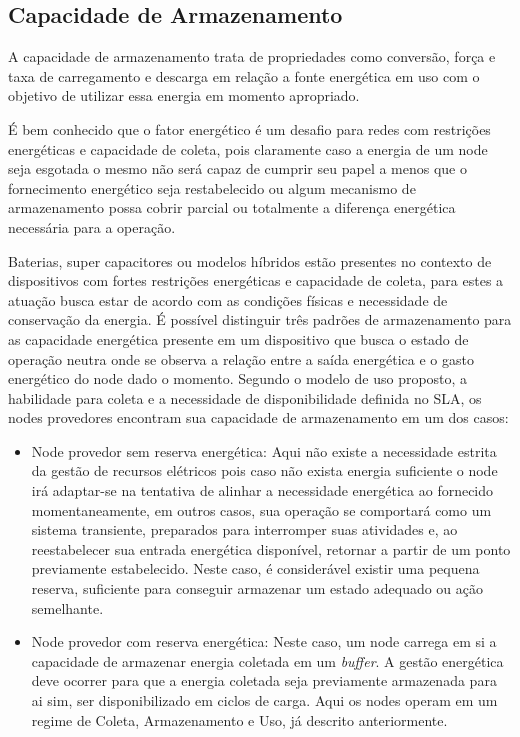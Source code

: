 \subsection{Capacidade de Armazenamento}\label{Capacidade de Armazenamento}
A capacidade de armazenamento trata de propriedades como conversão, força e taxa de carregamento e descarga em relação a fonte energética em uso com o objetivo de utilizar essa energia em momento apropriado. 

É bem conhecido que o fator energético é um desafio para redes com restrições energéticas e capacidade de coleta, pois claramente caso a energia de um node seja esgotada o mesmo não será capaz de cumprir seu papel a menos que o fornecimento energético seja restabelecido ou algum mecanismo de armazenamento possa cobrir parcial ou totalmente a diferença energética necessária para a operação.

Baterias, super capacitores ou modelos híbridos estão presentes no contexto de dispositivos com fortes restrições energéticas e capacidade de coleta, para estes a atuação busca estar de acordo com as condições físicas e necessidade de conservação da energia. É possível distinguir três padrões de armazenamento para as capacidade energética presente em um dispositivo que busca o estado de operação neutra onde se observa a relação entre a saída energética e o gasto energético do node dado o momento. Segundo o modelo de uso proposto, a habilidade para coleta e a necessidade de disponibilidade definida no \acs{SLA}, os nodes provedores encontram sua capacidade de armazenamento em um dos casos:

\begin{itemize}
    \item Node provedor sem reserva energética: Aqui não existe a necessidade estrita da gestão de recursos elétricos pois caso não exista energia suficiente o node irá adaptar-se na tentativa de alinhar a necessidade energética ao fornecido momentaneamente, em outros casos, sua operação se comportará como um sistema transiente, preparados para interromper suas atividades e, ao reestabelecer sua entrada energética disponível, retornar a partir de um ponto previamente estabelecido. Neste caso, é considerável existir uma pequena reserva, suficiente para conseguir armazenar um estado adequado ou ação semelhante.
    
    \item Node provedor com reserva energética: Neste caso, um node carrega em si a capacidade de armazenar energia coletada em um \textit{buffer}. A gestão energética deve ocorrer para que a energia coletada seja previamente armazenada para ai sim, ser disponibilizado em ciclos de carga. Aqui os nodes operam em um regime de Coleta, Armazenamento e Uso, já descrito anteriormente.
\end{itemize}

